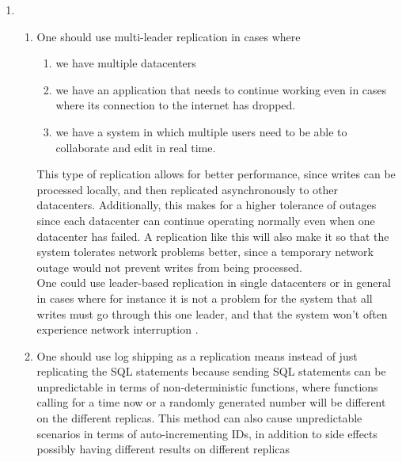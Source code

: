 \begin{enumerate}
    \item 
        \begin{enumerate}
            \item One should use multi-leader replication in cases where 
                \begin{enumerate} 
                    \item we have multiple datacenters
                    \item we have an application that needs to continue working
                        even in cases where its connection to the internet 
                        has dropped.
                    \item we have a system in which multiple users need to be 
                        able to collaborate and edit in real time.
                \end{enumerate}
                This type of replication allows for better performance, since 
                writes can be processed locally, and then replicated 
                asynchronously to other datacenters. Additionally, this makes 
                for a higher tolerance of outages since each datacenter can 
                continue operating normally even when one datacenter has failed. 
                A replication like this will also make it so that the system
                tolerates network problems better, since a temporary network
                outage would not prevent writes from being processed.
                \\ One could use leader-based replication in single datacenters or
                in general in cases where for instance it is not a problem for 
                the system that all writes must go through this one leader, and 
                that the system won't often experience network interruption
                \autocite[pp.~168-170]{kleppmann_2017}.
            \item One should use log shipping as a replication means instead of
                just replicating the SQL statements because sending SQL
                statements can be unpredictable in terms of non-deterministic
                functions, where functions calling for a time now or a randomly
                generated number will be different on the different replicas. 
                This method can also cause unpredictable scenarios in terms of
                auto-incrementing IDs, in addition to side effects
                possibly having different results on different replicas 

\end{enumerate}
\end{enumerate}
